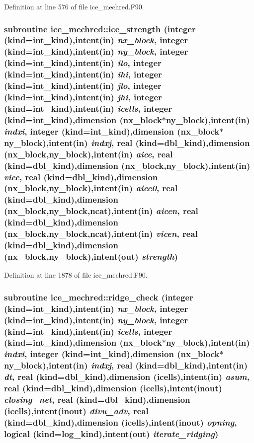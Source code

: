 Definition at line 576 of file ice\_\-mechred.F90.\hypertarget{namespaceice__mechred_a11d0a7efe6faca932079c613d5a7fdb7}{
\subsubsection[{ice\_\-strength}]{\setlength{\rightskip}{0pt plus 5cm}subroutine ice\_\-mechred::ice\_\-strength (integer (kind=int\_\-kind),intent(in) {\em nx\_\-block}, \/  integer (kind=int\_\-kind),intent(in) {\em ny\_\-block}, \/  integer (kind=int\_\-kind),intent(in) {\em ilo}, \/  integer (kind=int\_\-kind),intent(in) {\em ihi}, \/  integer (kind=int\_\-kind),intent(in) {\em jlo}, \/  integer (kind=int\_\-kind),intent(in) {\em jhi}, \/  integer (kind=int\_\-kind),intent(in) {\em icells}, \/  integer (kind=int\_\-kind),dimension (nx\_\-block$\ast$ny\_\-block),intent(in) {\em indxi}, \/  integer (kind=int\_\-kind),dimension (nx\_\-block$\ast$ny\_\-block),intent(in) {\em indxj}, \/  real (kind=dbl\_\-kind),dimension (nx\_\-block,ny\_\-block),intent(in) {\em aice}, \/  real (kind=dbl\_\-kind),dimension (nx\_\-block,ny\_\-block),intent(in) {\em vice}, \/  real (kind=dbl\_\-kind),dimension (nx\_\-block,ny\_\-block),intent(in) {\em aice0}, \/  real (kind=dbl\_\-kind),dimension (nx\_\-block,ny\_\-block,ncat),intent(in) {\em aicen}, \/  real (kind=dbl\_\-kind),dimension (nx\_\-block,ny\_\-block,ncat),intent(in) {\em vicen}, \/  real (kind=dbl\_\-kind),dimension (nx\_\-block,ny\_\-block),intent(out) {\em strength})}}
\label{namespaceice__mechred_a11d0a7efe6faca932079c613d5a7fdb7}


Definition at line 1878 of file ice\_\-mechred.F90.\hypertarget{namespaceice__mechred_af7cf08ba4d3da94152517c6058b2f219}{
\subsubsection[{ridge\_\-check}]{\setlength{\rightskip}{0pt plus 5cm}subroutine ice\_\-mechred::ridge\_\-check (integer (kind=int\_\-kind),intent(in) {\em nx\_\-block}, \/  integer (kind=int\_\-kind),intent(in) {\em ny\_\-block}, \/  integer (kind=int\_\-kind),intent(in) {\em icells}, \/  integer (kind=int\_\-kind),dimension (nx\_\-block$\ast$ny\_\-block),intent(in) {\em indxi}, \/  integer (kind=int\_\-kind),dimension (nx\_\-block$\ast$ny\_\-block),intent(in) {\em indxj}, \/  real (kind=dbl\_\-kind),intent(in) {\em dt}, \/  real (kind=dbl\_\-kind),dimension (icells),intent(in) {\em asum}, \/  real (kind=dbl\_\-kind),dimension (icells),intent(inout) {\em closing\_\-net}, \/  real (kind=dbl\_\-kind),dimension (icells),intent(inout) {\em divu\_\-adv}, \/  real (kind=dbl\_\-kind),dimension (icells),intent(inout) {\em opning}, \/  logical (kind=log\_\-kind),intent(out) {\em iterate\_\-ridging})}}
\label{namespaceice__mechred_af7cf08ba4d3da94152517c6058b2f219}


